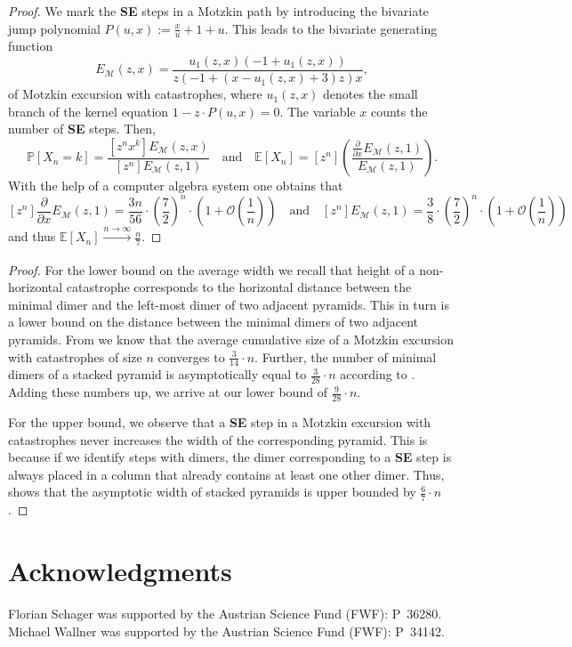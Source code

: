 \documentclass{article}
\theoremstyle{definition}
\begin{document}
\begin{proof}
  We mark the \textbf{SE} steps in a Motzkin path by introducing the bivariate jump polynomial $P(u,x) := \frac{x}{u} + 1 + u$. 
  This leads to the bivariate generating function
  \[
  E_\mathcal{M}(z,x) = \frac{u_1(z,x) \left(-1+u_1(z,x) \right)}{z \left(-1+\left(x -u_1(z,x) +3\right) z \right) x},
  \]
  of Motzkin excursion with catastrophes, where $u_1(z,x)$ denotes the small branch of the kernel equation $1 - z \cdot P(u,x) = 0$. The variable $x$ counts the number of \textbf{SE} steps.
   Then, 
  \[
    \mathbb{P}[X_n = k] = \frac{[z^n x^k] E_\mathcal{M}(z,x)}{[z^n] E_\mathcal{M}(z,1)} \quad \text{and} \quad \mathbb{E}[X_n] = [z^n] \left(\frac{\frac{\partial}{\partial x} E_\mathcal{M}(z,1)}{ E_\mathcal{M}(z,1)}\right).
  \]
  With the help of a computer algebra system one obtains that
  \[
    [z^n] \frac{\partial}{\partial x} E_\mathcal{M}(z,1) = \frac{3n}{56} \cdot \left( \frac{7}{2}\right)^n \cdot \left(1 + \mathcal{O}\left(\frac{1}{n}\right)\right)  \quad \text{and} \quad [z^n] E_\mathcal{M}(z,1) = \frac{3}{8} \cdot \left( \frac{7}{2}\right)^n \cdot \left(1 + \mathcal{O}\left(\frac{1}{n}\right)\right)
  \]
  and thus $\mathbb{E}[X_n] \xrightarrow[]{{n \to \infty}} \frac{n}{7}$.
\end{proof}

\Width*

\begin{proof}
  For the lower bound on the average width we recall that height of a non-horizontal catastrophe corresponds to the horizontal distance between the minimal dimer and the left-most dimer of two adjacent pyramids. This in turn is a lower bound on the distance between the minimal dimers of two adjacent pyramids.
  From  we know that the average cumulative size of a Motzkin excursion with catastrophes of size $n$ converges to $\frac{3}{14} \cdot n$.
  Further, the number of minimal dimers of a stacked pyramid is asymptotically equal to $\frac{3}{28} \cdot n$ according to \cite[Proposition 2]{LatticeAnimals}.
  Adding these numbers up, we arrive at our lower bound of $\frac{9}{28} \cdot n$.

  For the upper bound, we observe that a \textbf{SE} step in a Motzkin excursion with catastrophes never increases the width of the corresponding pyramid. This is because if we identify steps with dimers, the dimer corresponding to a \textbf{SE} step is always placed in a column that already contains at least one other dimer.
  Thus,  shows that the asymptotic width of stacked pyramids is upper bounded by $\frac{6}{7} \cdot n$.
\end{proof}

\section*{Acknowledgments}

Florian Schager was supported by the Austrian Science Fund (FWF): P~36280. \\
Michael Wallner was supported by the Austrian Science Fund (FWF): P~34142. 


    
\end{document}

